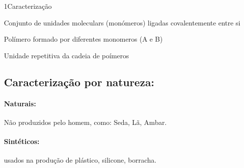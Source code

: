 \documentclass[\mainfilename]{subfiles}
\begin{document}
\begin{sectionBox}1{Caracterização} %
    
    \begin{description}[
        leftmargin=!,
        labelwidth=\widthof{Copolímero:} %
    ]
        \item[Polímero:] Conjunto de unidades moleculars (monómeros) ligadas covalentemente entre si
        \item[Copolímero:] Polímero formado por diferentes monomeros (A e B)
        \item[Monomero:] Unidade repetitiva da cadeia de poímeros
    \end{description}

    \subsection{Caracterização por natureza:}
    \begin{multicols}{2}
        \paragraph*{Naturais:} Não produzidos pelo homem, como: Seda, Lã, Ambar.
        \paragraph*{Sintéticos:} usados na produção de plástico, silicone, borracha.
    \end{multicols}


\end{sectionBox}
\end{document}
